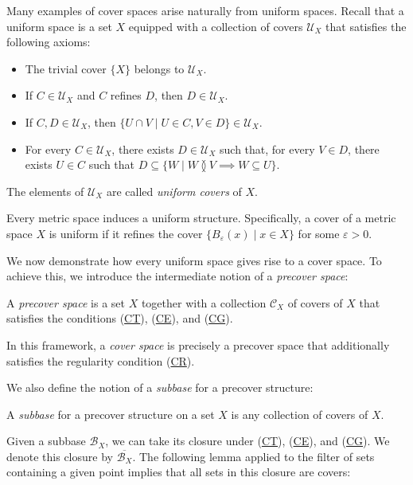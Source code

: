 \documentclass[pdflatex,sn-mathphys-num]{sn-jnl}
\newcommand{\axitem}[1]{\phantomsection \label{ax:#1}}
\newcommand{\axref}[1]{(\hyperref[ax:#1]{#1})}
\theoremstyle{definition}
\theoremstyle{remark}
\numberwithin{figure}{section}
\newcommand{\overlap}[2]{#1 \between #2}
\begin{document}
Many examples of cover spaces arise naturally from uniform spaces.
Recall that a uniform space \cite{isbell-uniform-spaces} is a set $X$ equipped with a collection of covers $\mathcal{U}_X$ that satisfies the following axioms:

\begin{itemize}[(UT)]
\item[(UT)] The trivial cover $\{ X \}$ belongs to $\mathcal{U}_X$.
\item[(UE)] \axitem{UE} If $C \in \mathcal{U}_X$ and $C$ refines $D$, then $D \in \mathcal{U}_X$.
\item[(UI)] \axitem{UI} If $C,D \in \mathcal{U}_X$, then $\{ U \cap V \mid U \in C, V \in D \} \in \mathcal{U}_X$.
\item[(UU)] \axitem{UU} For every $C \in \mathcal{U}_X$, there exists $D \in \mathcal{U}_X$ such that, for every $V \in D$,
there exists $U \in C$ such that $D \subseteq \{ W \mid \overlap{W}{V} \implies W \subseteq U \}$.
\end{itemize}
The elements of $\mathcal{U}_X$ are called \emph{uniform covers} of $X$.

\begin{example}
Every metric space induces a uniform structure.
Specifically, a cover of a metric space $X$ is uniform if it refines the cover $\{ B_\varepsilon(x) \mid x \in X \}$ for some $\varepsilon > 0$.
\end{example}

We now demonstrate how every uniform space gives rise to a cover space.
To achieve this, we introduce the intermediate notion of a \emph{precover space}:

\begin{defn}
A \emph{precover space} is a set $X$ together with a collection $\mathcal{C}_X$ of covers of $X$ that satisfies the conditions \axref{CT}, \axref{CE}, and \axref{CG}.
\end{defn}

In this framework, a \emph{cover space} is precisely a precover space that additionally satisfies the regularity condition \axref{CR}.

We also define the notion of a \emph{subbase} for a precover structure:

\begin{defn}
A \emph{subbase} for a precover structure on a set $X$ is any collection of covers of $X$.
\end{defn}

Given a subbase $\mathcal{B}_X$, we can take its closure under \axref{CT}, \axref{CE}, and \axref{CG}.
We denote this closure by $\overline{\mathcal{B}_X}$.
The following lemma applied to the filter of sets containing a given point implies that all sets in this closure are covers:
\end{document}
